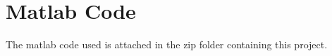 \documentclass[12pt]{extarticle}
\begin{document}
\newpage
\appendix
\section*{Matlab Code}
The matlab code used is attached in the zip folder containing this project.
%
%
%
\end{document}
